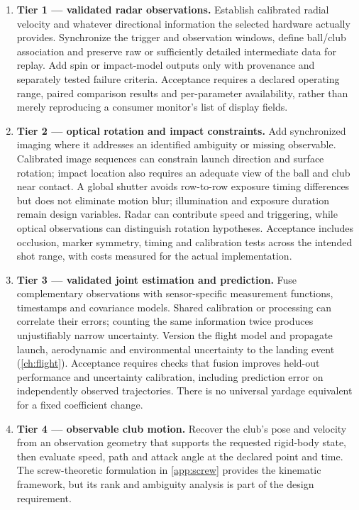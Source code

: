 \begin{enumerate}
\item \textbf{Tier 1 --- validated radar observations.}
Establish calibrated radial velocity and whatever directional information the selected hardware actually provides.
Synchronize the trigger and observation windows, define ball/club association and preserve raw or sufficiently detailed intermediate data for replay.
Add spin or impact-model outputs only with provenance and separately tested failure criteria.
Acceptance requires a declared operating range, paired comparison results and per-parameter availability, rather than merely reproducing a consumer monitor's list of display fields.
\item \textbf{Tier 2 --- optical rotation and impact constraints.}
Add synchronized imaging where it addresses an identified ambiguity or missing observable.
Calibrated image sequences can constrain launch direction and surface rotation; impact location also requires an adequate view of the ball and club near contact.
A global shutter avoids row-to-row exposure timing differences but does not eliminate motion blur; illumination and exposure duration remain design variables.
Radar can contribute speed and triggering, while optical observations can distinguish rotation hypotheses.
Acceptance includes occlusion, marker symmetry, timing and calibration tests across the intended shot range, with costs measured for the actual implementation.
\item \textbf{Tier 3 --- validated joint estimation and prediction.}
Fuse complementary observations with sensor-specific measurement functions, timestamps and covariance models.
Shared calibration or processing can correlate their errors; counting the same information twice produces unjustifiably narrow uncertainty.
Version the flight model and propagate launch, aerodynamic and environmental uncertainty to the landing event (\cref{ch:flight}).
Acceptance requires checks that fusion improves held-out performance and uncertainty calibration, including prediction error on independently observed trajectories.
There is no universal yardage equivalent for a fixed coefficient change.
\item \textbf{Tier 4 --- observable club motion.}
Recover the club's pose and velocity from an observation geometry that supports the requested rigid-body state, then evaluate speed, path and attack angle at the declared point and time.
The screw-theoretic formulation in \cref{app:screw} provides the kinematic framework, but its rank and ambiguity analysis is part of the design requirement.

\end{enumerate}
